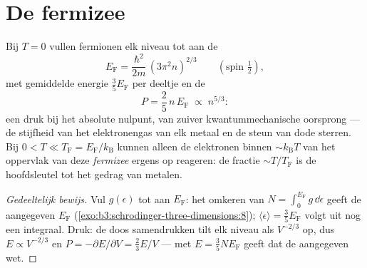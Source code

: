 \section{De fermizee}

\begin{theorem}\label{thm:b3:quantum-statistics:fermi}
Bij $T = 0$ vullen fermionen elk niveau tot aan de \emph{}
\[
E_{\text{F}} = \frac{\hbar^2}{2m}\,(3\pi^2n)^{2/3}
\qquad (\text{spin } \tfrac12) ,
\]
met gemiddelde energie $\tfrac35 E_{\text{F}}$ per deeltje en de
\emph{}
\[
P = \frac25\,n\,E_{\text{F}} \;\propto\; n^{5/3} :
\]
een druk bij het absolute nulpunt, van zuiver kwantummechanische
oorsprong --- de stijfheid van het elektronengas van elk metaal en de
steun van dode sterren. Bij $0 < T \ll T_{\text{F}} = E_{\text{F}}/k_{\text{B}}$ kunnen alleen de elektronen binnen $\sim k_{\text{B}}T$ van het oppervlak van deze \emph{fermizee} ergens op
reageren: de fractie $\sim T/T_{\text{F}}$ is de hoofdsleutel tot het
gedrag van metalen.
\end{theorem}

\begin{proof}[Gedeeltelijk bewijs]
Vul $g(\epsilon)$ tot aan $E_{\text{F}}$: het omkeren van $N = \int_0^{
E_{\text{F}}}g\,\dd\epsilon$ geeft de aangegeven $E_{\text{F}}$
(\cref{exo:b3:schrodinger-three-dimensions:8}); $\langle\epsilon
\rangle = \tfrac35 E_{\text{F}}$ volgt uit nog een integraal. Druk: de doos
samendrukken tilt elk niveau als $V^{-2/3}$ op, dus $E
\propto V^{-2/3}$
en $P = -\partial E/\partial V = \tfrac23 E/V$ --- met $E = \tfrac35 NE_{\text{F}}$ geeft dat de aangegeven wet.
\end{proof}

